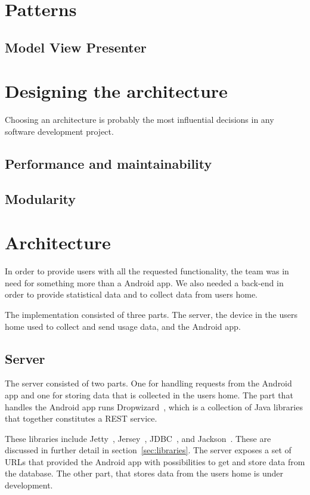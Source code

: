 \section{Patterns}
\subsection{Model View Presenter}

\section{Designing the architecture}
Choosing an architecture is probably the most influential decisions in any software development project. 
\subsection{Performance and maintainability}
\subsection{Modularity}

\section{Architecture}
In order to provide users with all the requested functionality, the team was in need for something more than a Android app. We also needed a back-end in order to provide statistical data and to collect data from users home.

The implementation consisted of three parts. The server, the device in the users home used to collect and send usage data, and the Android app.

\subsection{Server}
The server consisted of two parts. One for handling requests from the Android app and one for storing data that is collected in the users home. 
The part that handles the Android app runs Dropwizard~\cite{dropwizard}, which is a collection of Java libraries that together constitutes a REST service. 

These libraries include Jetty~\cite{jetty}, Jersey~\cite{jersey}, JDBC~\cite{jdbc}, and Jackson~\cite{jackson}. These are discussed in further detail in section~\ref{sec:libraries}.
The server exposes a set of URLs that provided the Android app with 
possibilities to get and store data from the database. The other part, that stores data from the users home is under development.

